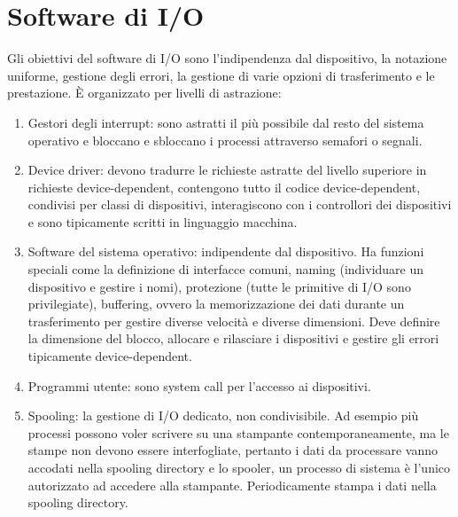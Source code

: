 \section{Software di I/O}
Gli obiettivi del software di I/O sono l'indipendenza dal dispositivo, la notazione uniforme, gestione degli errori, la gestione di varie opzioni di trasferimento e le prestazione. \`E
organizzato per livelli di astrazione: 
\begin{enumerate}
	\item Gestori degli interrupt: sono astratti il pi\`u possibile dal resto del sistema operativo e bloccano e sbloccano i processi attraverso semafori o segnali.
	\item Device driver: devono tradurre le richieste astratte del livello superiore in richieste device-dependent, contengono tutto il codice device-dependent, condivisi per classi
		di dispositivi, interagiscono con i controllori dei dispositivi e sono tipicamente scritti in linguaggio macchina. 
	\item Software del sistema operativo: indipendente dal dispositivo. Ha funzioni speciali come la definizione di interfacce comuni, naming (individuare un dispositivo e gestire i 
		nomi), protezione (tutte le primitive di I/O sono privilegiate), buffering, ovvero la memorizzazione dei dati durante un trasferimento per gestire diverse velocit\`a 
		e diverse dimensioni. Deve definire la dimensione del blocco, allocare e rilasciare i dispositivi e gestire gli errori tipicamente device-dependent. 
	\item Programmi utente: sono system call per l'accesso ai dispositivi.
	\item Spooling: la gestione di I/O dedicato, non condivisibile. Ad esempio pi\`u processi possono voler scrivere su una stampante contemporaneamente, ma le stampe non devono essere interfogliate, 
pertanto i dati da processare vanno accodati nella spooling directory e lo spooler, un processo di sistema \`e l'unico autorizzato ad accedere alla stampante. Periodicamente stampa i dati nella spooling directory.
\end{enumerate}
